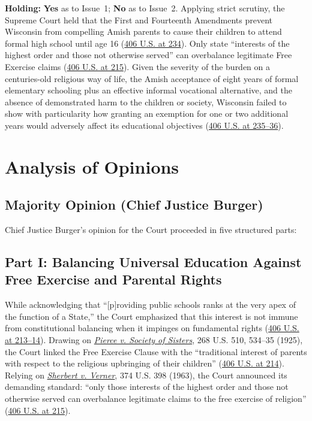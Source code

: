 \documentclass[12pt]{article}
\begin{document}
\textbf{Holding:} \textbf{Yes} as to Issue~1; \textbf{No} as to Issue~2. Applying strict scrutiny, the Supreme Court held that the First and Fourteenth Amendments prevent Wisconsin from compelling Amish parents to cause their children to attend formal high school until age 16 (\href{https://supreme.justia.com/cases/federal/us/406/205/}{406 U.S. at 234}). Only state ``interests of the highest order and those not otherwise served'' can overbalance legitimate Free Exercise claims (\href{https://supreme.justia.com/cases/federal/us/406/205/}{406 U.S. at 215}). Given the severity of the burden on a centuries-old religious way of life, the Amish acceptance of eight years of formal elementary schooling plus an effective informal vocational alternative, and the absence of demonstrated harm to the children or society, Wisconsin failed to show with particularity how granting an exemption for one or two additional years would adversely affect its educational objectives (\href{https://supreme.justia.com/cases/federal/us/406/205/}{406 U.S. at 235--36}).

\section{Analysis of Opinions}
\subsection{Majority Opinion (Chief Justice Burger)}

Chief Justice Burger's opinion for the Court proceeded in five structured parts:

\subsection{Part I: Balancing Universal Education Against Free Exercise and Parental Rights}

While acknowledging that ``[p]roviding public schools ranks at the very apex of the function of a State,'' the Court emphasized that this interest is not immune from constitutional balancing when it impinges on fundamental rights (\href{https://supreme.justia.com/cases/federal/us/406/205/}{406 U.S. at 213--14}). Drawing on \href{https://supreme.justia.com/cases/federal/us/268/510/}{\emph{Pierce v. Society of Sisters}}, 268 U.S. 510, 534--35 (1925), the Court linked the Free Exercise Clause with the ``traditional interest of parents with respect to the religious upbringing of their children'' (\href{https://supreme.justia.com/cases/federal/us/406/205/}{406 U.S. at 214}). Relying on \href{https://supreme.justia.com/cases/federal/us/374/398/}{\emph{Sherbert v. Verner}}, 374 U.S. 398 (1963), the Court announced its demanding standard: ``only those interests of the highest order and those not otherwise served can overbalance legitimate claims to the free exercise of religion'' (\href{https://supreme.justia.com/cases/federal/us/406/205/}{406 U.S. at 215}).
\end{document}
